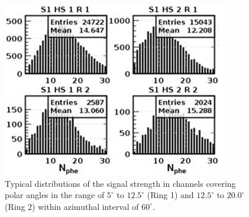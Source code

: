 \begin{figure}[!ht]
    \centering
    \includegraphics[width=1.0\linewidth,trim={0.0cm 0.0cm 0.0cm 0.0cm},clip]{images/Signal_S1_HS1_HS2_R1_R2.jpg}
    \caption{Typical distributions of the signal strength in channels covering polar angles in the range of $5^\circ$ to $12.5^\circ$ (Ring 1) and $12.5^\circ$ to $20.0^\circ$ (Ring 2) within azimuthal interval of $60^\circ$.}
    \label{fig:Signal_S1_HS1_HS2_R1_R2}
\end{figure}

